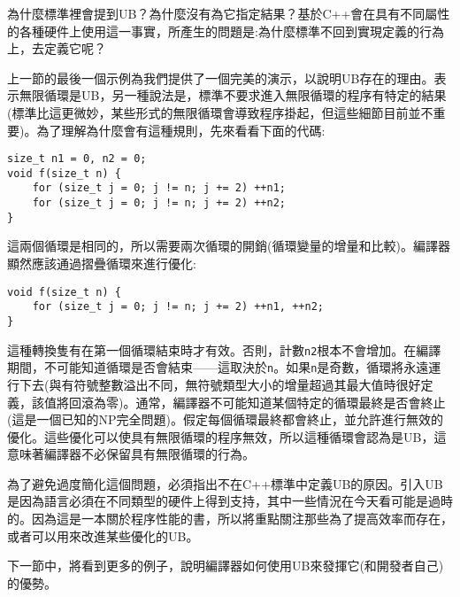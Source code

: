 為什麼標準裡會提到UB？為什麼沒有為它指定結果？基於C++會在具有不同屬性的各種硬件上使用這一事實，所產生的問題是:為什麼標準不回到實現定義的行為上，去定義它呢？

上一節的最後一個示例為我們提供了一個完美的演示，以說明UB存在的理由。表示無限循環是UB，另一種說法是，標準不要求進入無限循環的程序有特定的結果(標準比這更微妙，某些形式的無限循環會導致程序掛起，但這些細節目前並不重要)。為了理解為什麼會有這種規則，先來看看下面的代碼:

\begin{lstlisting}[style=styleCXX]
size_t n1 = 0, n2 = 0;
void f(size_t n) {
	for (size_t j = 0; j != n; j += 2) ++n1; 
	for (size_t j = 0; j != n; j += 2) ++n2;
}
\end{lstlisting}

這兩個循環是相同的，所以需要兩次循環的開銷(循環變量的增量和比較)。編譯器顯然應該通過摺疊循環來進行優化:

\begin{lstlisting}[style=styleCXX]
void f(size_t n) {
	for (size_t j = 0; j != n; j += 2) ++n1, ++n2;
}
\end{lstlisting}

這種轉換隻有在第一個循環結束時才有效。否則，計數\texttt{n2}根本不會增加。在編譯期間，不可能知道循環是否會結束——這取決於\texttt{n}。如果\texttt{n}是奇數，循環將永遠運行下去(與有符號整數溢出不同，無符號類型大小的增量超過其最大值時很好定義，該值將回滾為零)。通常，編譯器不可能知道某個特定的循環最終是否會終止(這是一個已知的NP完全問題)。假定每個循環最終都會終止，並允許進行無效的優化。這些優化可以使具有無限循環的程序無效，所以這種循環會認為是UB，這意味著編譯器不必保留具有無限循環的行為。

為了避免過度簡化這個問題，必須指出不在C++標準中定義UB的原因。引入UB是因為語言必須在不同類型的硬件上得到支持，其中一些情況在今天看可能是過時的。因為這是一本關於程序性能的書，所以將重點關注那些為了提高效率而存在，或者可以用來改進某些優化的UB。

下一節中，將看到更多的例子，說明編譯器如何使用UB來發揮它(和開發者自己)的優勢。




































